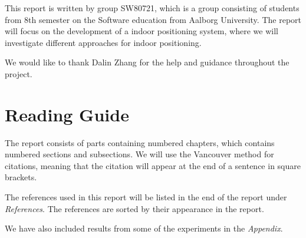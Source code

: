This report is written by group SW80721, which is a group consisting of students from 8th semester on the Software education from Aalborg University. The report will focus on the development of a indoor positioning system, where we will investigate different approaches for indoor positioning.

We would like to thank Dalin Zhang for the help and guidance throughout the project.

\section*{Reading Guide}

The report consists of parts containing numbered chapters, which contains numbered sections and subsections. We will use the Vancouver method for citations, meaning that the citation will appear at the end of a sentence in square brackets.

The references used in this report will be listed in the end of the report under \textit{References}. The references are sorted by their appearance in the report.

We have also included results from some of the experiments in the \textit{Appendix}.